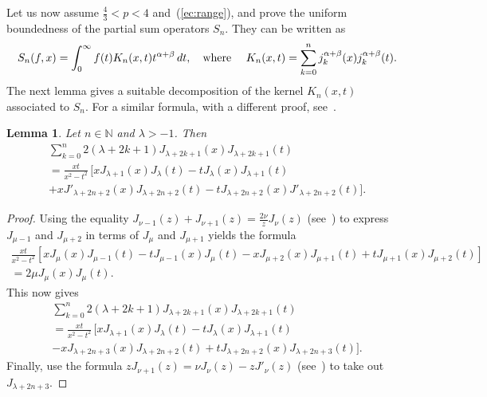 \documentclass[reqno]{amsart}
\theoremstyle{plain}
\newtheorem{Lem}{Lemma}
\theoremstyle{definition}
\theoremstyle{remark}
\begin{document}
Let us now assume $\frac43<p<4$ and~(\ref{ec:range}), and prove the uniform
boundedness of the partial sum operators $S_n$. They can be written as
\begin{equation*}
   S_n(f,x) = \int_0^\infty {f(t) K_n(x,t) t^{\alpha+\beta}\,dt}, \quad
   \text{where \quad}
   K_n(x,t) = \sum_{k=0}^n j_k^{\alpha+\beta}(x) j_k^{\alpha+\beta}(t).
\end{equation*}
The next lemma gives a suitable decomposition of the kernel $K_n(x,t)$
associated to $S_n$. For a similar formula, with a different proof,
see~\cite{Var}.

\begin{Lem}
\label{lem:decomp}
Let $n \in \mathbb{N}$ and $\lambda > -1$. Then
\begin{multline*}
   \sum_{k=0}^n 2 (\lambda+2k+1) J_{\lambda+2k+1}(x) J_{\lambda+2k+1}(t)
   \\
   = \frac{xt}{x^2-t^2} \, [
   x J_{\lambda+1}(x) J_\lambda(t) - t J_\lambda(x) J_{\lambda+1}(t)
   \\
   + x J'_{\lambda+2n+2}(x) J_{\lambda+2n+2}(t)
   - t J_{\lambda+2n+2}(x) J'_{\lambda+2n+2}(t)
   ].
\end{multline*}
\end{Lem}

\begin{proof}
Using the equality $J_{\nu-1}(z) + J_{\nu+1}(z) = \frac{2 \nu}z J_\nu(z)$
(see~\cite[Ch.~III, 3.2, p.~45]{Wat}) to express $J_{\mu-1}$ and $J_{\mu+2}$ in
terms of $J_\mu$ and $J_{\mu+1}$ yields the formula
\begin{gather*}
  \frac{xt}{x^2-t^2} \left[
   x J_\mu(x) J_{\mu-1}(t) - t J_{\mu-1}(x) J_\mu(t)
   - x J_{\mu+2}(x) J_{\mu+1}(t)
   + t J_{\mu+1}(x) J_{\mu+2}(t)
   \right]
   \\
   = 2 \mu J_\mu(x) J_\mu(t).
\end{gather*}
This now gives
\begin{multline*}
   \sum_{k=0}^n
   2 (\lambda+2k+1) J_{\lambda+2k+1}(x) J_{\lambda+2k+1}(t)
   \\
   = \frac{xt}{x^2-t^2} \, [
   x J_{\lambda+1}(x) J_\lambda(t) - t J_\lambda(x) J_{\lambda+1}(t)
   \\
   - x J_{\lambda+2n+3}(x) J_{\lambda+2n+2}(t)
   + t J_{\lambda+2n+2}(x) J_{\lambda+2n+3}(t)
   ].
\end{multline*}
Finally, use the formula $z J_{\nu+1}(z) = \nu J_\nu(z) - z J'_\nu(z)$
(see~\cite[Ch.~III, 3.2, p.~45]{Wat}) to take out $J_{\lambda+2n+3}$.
\end{proof}
\end{document}
